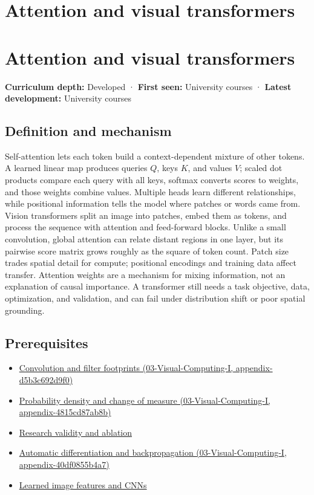 \hypertarget{appendix-a9d5dfdd164a}{}
\section*{Attention and visual transformers}
\section{Attention and visual transformers}\label{appendix-a9d5dfdd164a-attention-and-visual-transformers}

\textbf{Curriculum depth:} Developed · \textbf{First seen:} University courses · \textbf{Latest development:} University courses

\subsection{Definition and mechanism}\label{appendix-a9d5dfdd164a-definition-and-mechanism}

Self-attention lets each token build a context-dependent mixture of other tokens. A learned linear map produces queries \(Q\), keys \(K\), and values \(V\); scaled dot products compare each query with all keys, softmax converts scores to weights, and those weights combine values. Multiple heads learn different relationships, while positional information tells the model where patches or words came from. Vision transformers split an image into patches, embed them as tokens, and process the sequence with attention and feed-forward blocks. Unlike a small convolution, global attention can relate distant regions in one layer, but its pairwise score matrix grows roughly as the square of token count. Patch size trades spatial detail for compute; positional encodings and training data affect transfer. Attention weights are a mechanism for mixing information, not an explanation of causal importance. A transformer still needs a task objective, data, optimization, and validation, and can fail under distribution shift or poor spatial grounding.

\subsection{Prerequisites}\label{appendix-a9d5dfdd164a-prerequisites}

\begin{itemize}
\tightlist
\item
  \href{../03-Visual-Computing-I/main.pdf\#nameddest=appendix-d5b3c692d9f0}{Convolution and filter footprints (03-Visual-Computing-I, appendix-d5b3c692d9f0)}
\item
  \href{../03-Visual-Computing-I/main.pdf\#nameddest=appendix-4815cd87ab8b}{Probability density and change of measure (03-Visual-Computing-I, appendix-4815cd87ab8b)}
\item
  \hyperref[appendix-65788587ef78]{Research validity and ablation}
\item
  \href{../03-Visual-Computing-I/main.pdf\#nameddest=appendix-40df0855b4a7}{Automatic differentiation and backpropagation (03-Visual-Computing-I, appendix-40df0855b4a7)}
\item
  \hyperref[appendix-47c51ea026fb]{Learned image features and CNNs}
\end{itemize}

